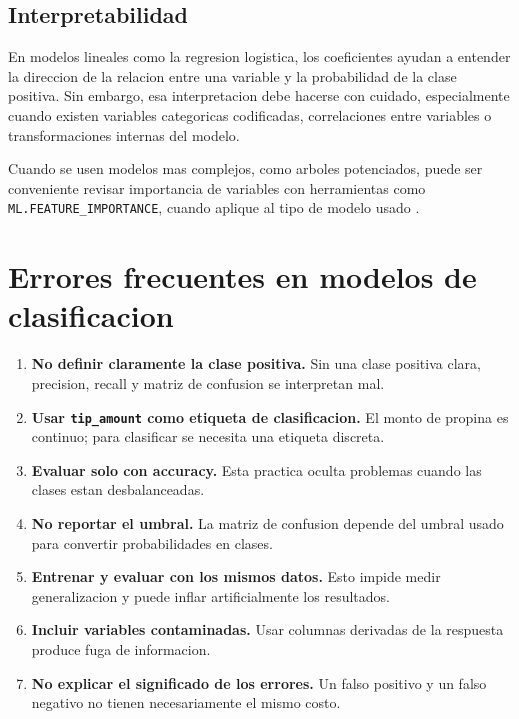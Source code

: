\documentclass[12pt]{article}
\begin{document}
\subsection{Interpretabilidad}
En modelos lineales como la regresion logistica, los coeficientes ayudan a entender la direccion de la relacion entre una variable y la probabilidad de la clase positiva. Sin embargo, esa interpretacion debe hacerse con cuidado, especialmente cuando existen variables categoricas codificadas, correlaciones entre variables o transformaciones internas del modelo.

Cuando se usen modelos mas complejos, como arboles potenciados, puede ser conveniente revisar importancia de variables con herramientas como \texttt{ML.FEATURE\_IMPORTANCE}, cuando aplique al tipo de modelo usado \cite{gcp_feature_importance}.

\section{Errores frecuentes en modelos de clasificacion}
\begin{enumerate}[label=\textbf{C\arabic*.}, leftmargin=*]
\item \textbf{No definir claramente la clase positiva.} Sin una clase positiva clara, precision, recall y matriz de confusion se interpretan mal.
\item \textbf{Usar \texttt{tip\_amount} como etiqueta de clasificacion.} El monto de propina es continuo; para clasificar se necesita una etiqueta discreta.
\item \textbf{Evaluar solo con accuracy.} Esta practica oculta problemas cuando las clases estan desbalanceadas.
\item \textbf{No reportar el umbral.} La matriz de confusion depende del umbral usado para convertir probabilidades en clases.
\item \textbf{Entrenar y evaluar con los mismos datos.} Esto impide medir generalizacion y puede inflar artificialmente los resultados.
\item \textbf{Incluir variables contaminadas.} Usar columnas derivadas de la respuesta produce fuga de informacion.
\item \textbf{No explicar el significado de los errores.} Un falso positivo y un falso negativo no tienen necesariamente el mismo costo.
\end{enumerate}
\end{document}
